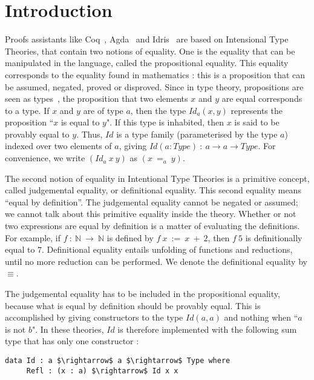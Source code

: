 \section{Introduction}

Proofs assistants like Coq~\cite{BertotC04}, Agda~\cite{DBLP:conf/tldi/Norell09} and Idris~\cite{brady2013idris} are based on Intensional Type Theories, that contain two notions of equality. One is the equality that can be manipulated in the language, called the propositional equality. This equality corresponds to the equality found in mathematics : this is a proposition that can be assumed, negated, proved or disproved. Since in type theory, propositions are seen as types~\cite{How80}, the
proposition that two elements $x$ and $y$ are equal corresponds to a type.
If $x$ and $y$ are of type $a$, then the type
$Id_a(x, y)$ represents the proposition ``$x$ is equal to $y$". If this type is
inhabited, then $x$ is said to be provably equal to $y$. Thus, $Id$ is a type family (parameterised by the type $a$) indexed over two elements of $a$, giving $Id (a:Type)\ :\ a \rightarrow a \rightarrow Type$. For
convenience, we write $(Id_a\ x\ y)$ as $(x\ =_a\ y)$. 

The second notion of equality in Intentional Type Theories is a primitive concept, called judgemental equality, or definitional equality. This second equality means ``equal by definition''. The judgemental equality cannot be negated or assumed; we cannot talk about this primitive equality inside the theory.
Whether or not two expressions are equal by definition is a matter of
evaluating the definitions. For example, if $f\ :\ \mathbb{N}\ \rightarrow\
\mathbb{N}$ is defined by $f\ x\ :=\ x\ +\ 2$, then $f\ 5$ is
definitionally equal to $7$. Definitional equality entails unfolding
of functions and reductions, until no more reduction can be
performed. We denote the definitional equality by $\equiv$.

The judgemental equality has to be included in the propositional equality, because what is equal by definition should be provably equal. This is accomplished by giving constructors to the type $Id(a,a)$ and nothing when ``$a$ is not $b$".
In these theories, $Id$ is therefore implemented with the following sum type that has only one constructor :

\begin{lstlisting}
data Id : a $\rightarrow$ a $\rightarrow$ Type where
     Refl : (x : a) $\rightarrow$ Id x x
\end{lstlisting}


